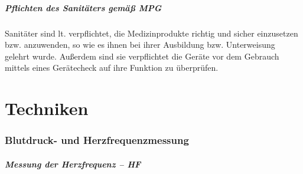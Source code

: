 \documentclass{beamer}
\begin{document}
\begin{frame}
\frametitle{Pflichten des Sanitäters gemäß MPG}

Sanitäter sind lt.  verpflichtet, die
Medizinprodukte richtig und sicher einzusetzen bzw. anzuwenden, so wie es
ihnen bei ihrer Ausbildung bzw. Unterweisung gelehrt wurde.
Außerdem sind sie verpflichtet die Geräte vor dem Gebrauch
mittels eines Gerätecheck auf ihre Funktion zu überprüfen.

\end{frame}
\part{Techniken}
\partpage
 
\section{Blutdruck- und Herzfrequenzmessung}

\begin{frame}
\frametitle{Messung der Herzfrequenz -- HF}

\end{frame}
\end{document}

